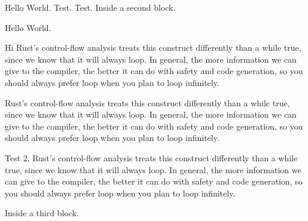 Hello World.
Test.
Test.
Inside a second block.
\begin{frame}[test]
Hello World.
	\begin{frame}{Hi}
		Rust’s control-flow analysis treats this construct differently than a while true, since we know that it will always loop. In general, the more information we can give to the compiler, the better it can do with safety and code generation, so you should always prefer loop when you plan to loop infinitely.
	\end{frame}
\end{frame}
Rust’s control-flow analysis treats this construct differently than a while true, since we know that it will always loop. In general, the more information we can give to the compiler, the better it can do with safety and code generation, so you should always prefer loop when you plan to loop infinitely.
\begin{frame}\end{frame}
	\begin{frame}\end{frame}
\begin{frame}
	Test 2.
	Rust’s control-flow analysis treats this construct differently than a while true, since we know that it will always loop. In general, the more information we can give to the compiler, the better it can do with safety and code generation, so you should always prefer loop when you plan to loop infinitely.
\end{frame}
Inside a third block.
